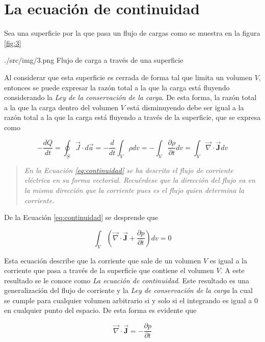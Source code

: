 \section{La ecuación de continuidad}
Sea una superficie por la que pasa un flujo de cargas como se muestra en la figura \ref{fig:3}

\imagen
    {./src/img/3.png}
    {Flujo de carga a través de una superficie}
    {\label{fig:3}}

Al considerar que esta superficie es cerrada de forma tal que limita un volumen $V$, entonces se puede expresar la razón total a la que la carga está fluyendo considerando la \emph{Ley de la conservación de la carga}. De esta forma, la razón total a la que la carga dentro del volumen $V$ está disminuyendo debe ser igual a la razón total a la que la carga está fluyendo a través de la superficie, que se expresa como

\begin{equation}
    - \frac{dQ}{dt} = \oint_{S} \vec{J} \cdot d\vec{a} = - \frac{d}{dt} \int_{V} \rho dv = - \int_{V} \frac{\partial{\rho}}{\partial{t}} dv = \int_{V} \vec{\nabla} \cdot \vec{\textbf{J}} dv
    \label{eq:continuidad}
\end{equation}

\begin{quote}
    \emph{En la Ecuación \eqref{eq:continuidad} se ha descrito el flujo de corriente eléctrica en su forma vectorial. Recuérdese que la dirección del flujo va en la misma dirección que la corriente pues es el flujo quien determina la corriente.}
\end{quote}

De la Ecuación \eqref{eq:continuidad} se desprende que

\begin{equation}
    \int_{V} \left( \vec{\nabla} \cdot \vec{\textbf{J}} + \frac{\partial{p}}{\partial{t}} \right) dv = 0
\end{equation}

Esta ecuación describe que la corriente que sale de un volumen $V$ es igual a la corriente que pasa a través de la superficie que contiene el volumen $V$. A este resultado se le conoce como \emph{La ecuación de continuidad}. Este resultado es una generalización del flujo de corriente y la \emph{Ley de conservación de la carga} la cual se cumple para cualquier volumen arbitrario si y solo si el integrando es igual a 0 en cualquier punto del espacio. De esta forma es evidente que

\begin{equation}
    \vec{\nabla} \cdot \vec{\textbf{J}} = - \frac{\partial{p}}{\partial{t}}
\end{equation}

